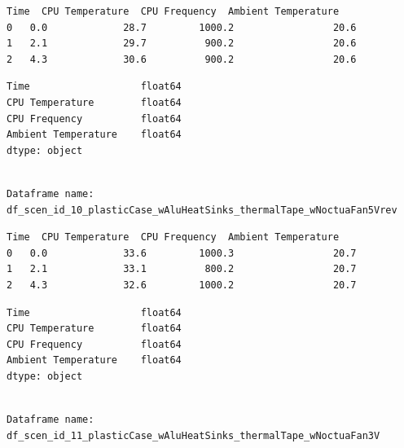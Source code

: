 \documentclass[10pt,parskip=half,
toc=sectionentrywithdots,
bibliography=totocnumbered,
captions=tableheading,numbers=noendperiod]{scrartcl}
\begin{document}
\begin{lstlisting}[language={},postbreak={},numbers=none,xrightmargin=7pt,breakindent=0pt,aboveskip=5pt,belowskip=5pt]
   Time  CPU Temperature  CPU Frequency  Ambient Temperature
0   0.0             28.7         1000.2                 20.6
1   2.1             29.7          900.2                 20.6
2   4.3             30.6          900.2                 20.6
\end{lstlisting}

\begin{lstlisting}[language={},postbreak={},numbers=none,xrightmargin=7pt,breakindent=0pt,aboveskip=5pt,belowskip=5pt]
Time                   float64
CPU Temperature        float64
CPU Frequency          float64
Ambient Temperature    float64
dtype: object
\end{lstlisting}

\begin{lstlisting}[language={},postbreak={},numbers=none,xrightmargin=7pt,belowskip=5pt,aboveskip=5pt,breakindent=0pt]

Dataframe name: df_scen_id_10_plasticCase_wAluHeatSinks_thermalTape_wNoctuaFan5Vrev

\end{lstlisting}

\begin{lstlisting}[language={},postbreak={},numbers=none,xrightmargin=7pt,breakindent=0pt,aboveskip=5pt,belowskip=5pt]
   Time  CPU Temperature  CPU Frequency  Ambient Temperature
0   0.0             33.6         1000.3                 20.7
1   2.1             33.1          800.2                 20.7
2   4.3             32.6         1000.2                 20.7
\end{lstlisting}

\begin{lstlisting}[language={},postbreak={},numbers=none,xrightmargin=7pt,breakindent=0pt,aboveskip=5pt,belowskip=5pt]
Time                   float64
CPU Temperature        float64
CPU Frequency          float64
Ambient Temperature    float64
dtype: object
\end{lstlisting}

\begin{lstlisting}[language={},postbreak={},numbers=none,xrightmargin=7pt,belowskip=5pt,aboveskip=5pt,breakindent=0pt]

Dataframe name: df_scen_id_11_plasticCase_wAluHeatSinks_thermalTape_wNoctuaFan3V

\end{lstlisting}
\end{document}
